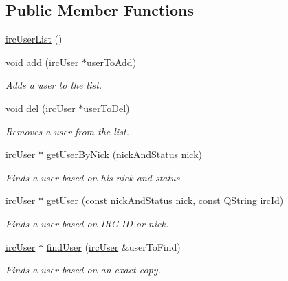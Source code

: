 \subsection*{Public Member Functions}
\begin{DoxyCompactItemize}
\item 
\hyperlink{classserver_1_1irc_user_list_a9b9cf433ca7bd02e8a86b284edfce11f}{irc\-User\-List} ()
\item 
void \hyperlink{classserver_1_1irc_user_list_a19af488638607e1cc77e94692e3cf3b1}{add} (\hyperlink{classserver_1_1irc_user}{irc\-User} $\ast$user\-To\-Add)
\begin{DoxyCompactList}\small\item\em Adds a user to the list. \end{DoxyCompactList}\item 
void \hyperlink{classserver_1_1irc_user_list_ae42c9f84545a97b504a25c399cc43666}{del} (\hyperlink{classserver_1_1irc_user}{irc\-User} $\ast$user\-To\-Del)
\begin{DoxyCompactList}\small\item\em Removes a user from the list. \end{DoxyCompactList}\item 
\hyperlink{classserver_1_1irc_user}{irc\-User} $\ast$ \hyperlink{classserver_1_1irc_user_list_a7f99e64e1cabde876fa6a827c6614a4e}{get\-User\-By\-Nick} (\hyperlink{structserver_1_1nick_and_status}{nick\-And\-Status} nick)
\begin{DoxyCompactList}\small\item\em Finds a user based on his nick and status. \end{DoxyCompactList}\item 
\hyperlink{classserver_1_1irc_user}{irc\-User} $\ast$ \hyperlink{classserver_1_1irc_user_list_af2d5bdaf2ccd658679c933390500f0e2}{get\-User} (const \hyperlink{structserver_1_1nick_and_status}{nick\-And\-Status} nick, const Q\-String irc\-Id)
\begin{DoxyCompactList}\small\item\em Finds a user based on I\-R\-C-\/\-I\-D or nick. \end{DoxyCompactList}\item 
\hyperlink{classserver_1_1irc_user}{irc\-User} $\ast$ \hyperlink{classserver_1_1irc_user_list_a1bb31b8891ba4a6b5587ece131000244}{find\-User} (\hyperlink{classserver_1_1irc_user}{irc\-User} \&user\-To\-Find)
\begin{DoxyCompactList}\small\item\em Finds a user based on an exact copy. \end{DoxyCompactList}\item 

\end{DoxyCompactItemize}
